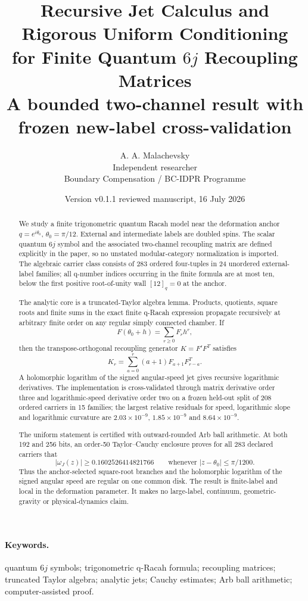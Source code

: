\documentclass[11pt]{article}
\title{Recursive Jet Calculus and Rigorous Uniform Conditioning\\
for Finite Quantum $6j$ Recoupling Matrices\\
\large A bounded two-channel result with frozen new-label cross-validation}
\author{A. A. Malachevsky\\
Independent researcher\\
Boundary Compensation / BC-IDPR Programme}
\date{Version v0.1.1 reviewed manuscript, 16 July 2026}
\begin{document}
\maketitle

\begin{abstract}
We study a finite trigonometric quantum Racah model near the deformation anchor $q=e^{i\theta_0}$, $\theta_0=\pi/12$.  External and intermediate labels are doubled spins.  The scalar quantum $6j$ symbol and the associated two-channel recoupling matrix are defined explicitly in the paper, so no unstated modular-category normalization is imported.  The algebraic carrier class consists of 283 ordered four-tuples in 24 unordered external-label families; all q-number indices occurring in the finite formula are at most ten, below the first positive root-of-unity wall $[12]_q=0$ at the anchor.

The analytic core is a truncated-Taylor algebra lemma.  Products, quotients, square roots and finite sums in the exact finite q-Racah expression propagate recursively at arbitrary finite order on any regular simply connected chamber.  If
\[
F(\theta_0+h)=\sum_{r\ge0}F_rh^r,
\]
then the transpose-orthogonal recoupling generator $K=F'F^T$ satisfies
\[
K_r=\sum_{a=0}^{r}(a+1)F_{a+1}F_{r-a}^{T}.
\]
A holomorphic logarithm of the signed angular-speed jet gives recursive logarithmic derivatives.  The implementation is cross-validated through matrix derivative order three and logarithmic-speed derivative order two on a frozen held-out split of 208 ordered carriers in 15 families; the largest relative residuals for speed, logarithmic slope and logarithmic curvature are $2.03\times10^{-9}$, $1.85\times10^{-9}$ and $8.64\times10^{-9}$.

The uniform statement is certified with outward-rounded Arb ball arithmetic.  At both 192 and 256 bits, an order-50 Taylor--Cauchy enclosure proves for all 283 declared carriers that
\[
|\omega_J(z)|\ge 0.1602526414821766
\qquad
\text{whenever }|z-\theta_0|\le \pi/1200.
\]
Thus the anchor-selected square-root branches and the holomorphic logarithm of the signed angular speed are regular on one common disk.  The result is finite-label and local in the deformation parameter.  It makes no large-label, continuum, geometric-gravity or physical-dynamics claim.
\end{abstract}

\paragraph{Keywords.}
quantum $6j$ symbols; trigonometric q-Racah formula; recoupling matrices; truncated Taylor algebra; analytic jets; Cauchy estimates; Arb ball arithmetic; computer-assisted proof.
\end{document}
